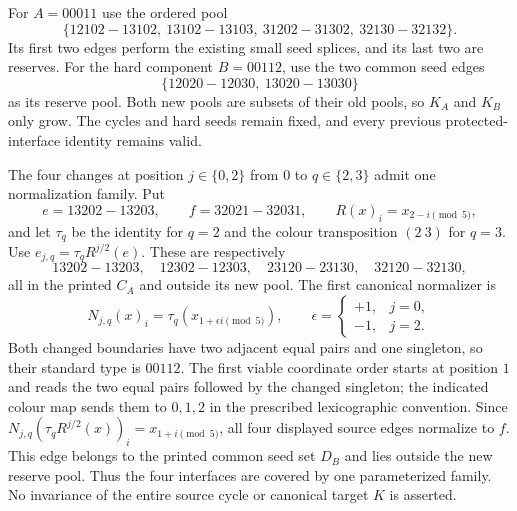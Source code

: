 For $A=00011$ use the ordered pool
\[
 \{12102\!-13102,\ 13102\!-13103,\
       31202\!-31302,\ 32130\!-32132\}.
\]
Its first two edges perform the existing small seed splices, and its last two
are reserves. For the hard component $B=00112$, use the two common seed edges
\[
 \{12020\!-12030,\ 13020\!-13030\}
\]
as its reserve pool. Both new pools are subsets of their old pools, so $K_A$
and $K_B$ only grow. The cycles and hard seeds remain fixed, and every previous
protected-interface identity remains valid.

The four changes at position $j\in\{0,2\}$ from $0$ to
$q\in\{2,3\}$ admit one normalization family. Put
\[
 e=13202\!-13203,\qquad f=32021\!-32031,
 \qquad R(x)_i=x_{2-i\pmod5},
\]
and let $\tau_q$ be the identity for $q=2$ and the colour transposition
$(2\ 3)$ for $q=3$. Use
$e_{j,q}=\tau_q R^{j/2}(e)$. These are respectively
\[
 13202\!-13203,\quad12302\!-12303,\quad
 23120\!-23130,\quad32120\!-32130,
\]
all in the printed $C_A$ and outside its new pool.
The first canonical normalizer is
\[
 N_{j,q}(x)_i=\tau_q(x_{1+\epsilon i\pmod5}),
 \qquad \epsilon=\begin{cases}+1,&j=0,\\-1,&j=2.\end{cases}
\]
Both changed boundaries have two adjacent equal pairs and one singleton,
so their standard type is $00112$. The first viable coordinate order starts
at position $1$ and reads
the two equal pairs followed by the changed singleton; the indicated colour
map sends them to $0,1,2$ in the prescribed lexicographic convention.
Since $N_{j,q}(\tau_q R^{j/2}(x))_i=x_{1+i\pmod5}$, all four displayed
source edges normalize to $f$. This edge belongs to the printed common
seed set $D_B$ and lies outside the new reserve pool. Thus the four interfaces
are covered by one parameterized family. No invariance of the entire source
cycle or canonical target $K$ is asserted.
